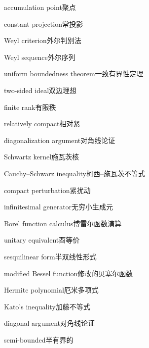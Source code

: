 \begin{multicols}{2}
accumulation point\hspace{0.9em}聚点\par
constant projection\hspace{0.9em}常投影\par
Weyl criterion\hspace{0.9em}外尔判别法\par
Weyl sequence\hspace{0.9em}外尔序列\par
uniform boundedness theorem\hspace{0.9em}一致有界性定理\par
two-sided ideal\hspace{0.9em}双边理想\par
finite rank\hspace{0.9em}有限秩\par
relatively compact\hspace{0.9em}相对紧\par
diagonalization argument\hspace{0.9em}对角线论证\par
Schwartz kernel\hspace{0.9em}施瓦茨核\par
Cauchy–Schwarz inequality\hspace{0.9em}柯西–施瓦茨不等式\par
compact perturbation\hspace{0.9em}紧扰动\par
infinitesimal generator\hspace{0.9em}无穷小生成元\par
Borel function calculus\hspace{0.9em}博雷尔函数演算\par
unitary equivalent\hspace{0.9em}酉等价\par
sesquilinear form\hspace{0.9em}半双线性形式\par
modified Bessel function\hspace{0.9em}修改的贝塞尔函数\par
Hermite polynomial\hspace{0.9em}厄米多项式\par
Kato's inequality\hspace{0.9em}加藤不等式\par
diagonal argument\hspace{0.9em}对角线论证\par
semi-bounded\hspace{0.9em}半有界的\par

\end{multicols}
